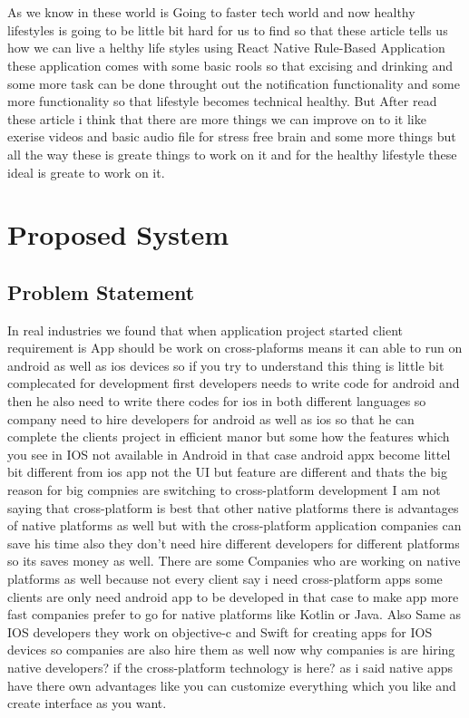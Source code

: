 \documentclass[12pt,a4paper]{report}
\begin{document}
\begin{enumerate}
\begin{tabular}{ |c | m{2.5cm} | m{2cm}| c | m{2cm} | m{2cm} | c | }
\end{tabular}
\\
\\
As  we know in these world is Going to faster tech world and now healthy lifestyles is going to be little bit hard for us to find so that these article tells us how we can live a helthy life styles using React Native Rule-Based Application these application comes with some basic rools so that excising and drinking and some more task can be done throught out the notification functionality and some more functionality so that lifestyle becomes technical healthy. But After read these article i think that there are more things we can improve on to it like exerise videos and basic audio file for stress free brain and some more things but all the way these is greate things to work on it and for the healthy lifestyle these ideal is greate to work on it.
\end{enumerate}
\newpage

\chapter{Proposed System}
\section{Problem Statement}
 In real industries we found that when application project started client requirement is App should be work on cross-plaforms means it can able to run on android as well as ios devices so if you try to understand this thing is little bit complecated for development first developers needs to write code for android and then he also need to write there codes for ios in both different languages so company need to hire developers for android as well as ios so that he can complete the clients project in efficient manor but some how the features which you see in IOS not available in Android in that case android appx become littel bit different from ios app not the UI but feature are different and thats the big reason for big compnies are switching to cross-platform development I am not saying that cross-platform is best that other native platforms there is advantages  of native platforms as well but with the cross-platform application companies can save his time also they don't need hire different developers for different platforms so its saves money as well. There are some Companies who are working on native platforms as well because not every client say i need cross-platform apps some clients are only need android app to be developed in that case to make app more fast companies prefer to go for native platforms like Kotlin or Java. Also Same as IOS developers they work on objective-c and Swift for creating apps for IOS devices so companies are also hire them as well now why companies is are hiring native developers? if the cross-platform technology is here? as i said native apps have there own advantages like you can customize everything which you like and create interface as you want.
\end{document}
